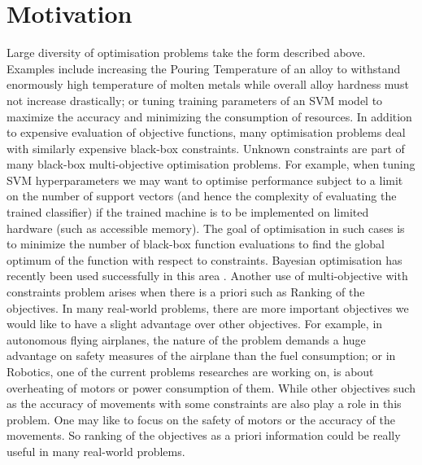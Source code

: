 \section{Motivation}\label{sec:mot}
Large diversity of optimisation problems take the form described above. Examples include increasing the Pouring Temperature of an alloy to withstand enormously high temperature of molten metals while overall alloy hardness must not increase drastically; or tuning training parameters of an SVM‌ model to maximize the accuracy and minimizing the consumption of resources. In addition to expensive evaluation of objective functions, many optimisation problems deal with similarly expensive black-box constraints. Unknown constraints are part of many black-box multi-objective optimisation problems. For example, when tuning SVM hyperparameters we may want to optimise performance subject to a limit on the number of support vectors (and hence the complexity of evaluating the trained classifier) if the trained machine is to be implemented on limited hardware (such as accessible memory). The goal of optimisation
in such cases is to minimize the number of black-box function evaluations to find the global optimum of the function with respect to constraints. Bayesian optimisation has recently been used successfully in this area \cite{MajidPaper2018}.
Another use of multi-objective with constraints problem arises when there is a priori such as Ranking of the objectives. In many real-world problems, there are more important objectives we would like to have a slight advantage over other objectives. For example, in autonomous flying airplanes, the nature of the problem demands a huge advantage on safety measures of the airplane than the fuel consumption; or in Robotics, one of the current problems researches are working on, is about overheating of motors or power consumption of them. While other objectives such as the accuracy of movements with some constraints are also play a role in this problem. One may like to focus on the safety of motors or the accuracy of the movements. So ranking of the objectives as a priori information could be really useful in many real-world problems.
%
